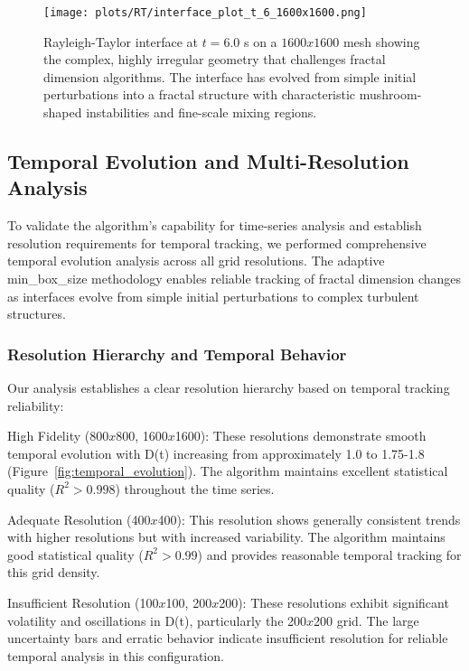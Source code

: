 \documentclass[preprint,12pt]{elsarticle}
\def\textbf#1{#1}%
\def\times{x}%
\begin{document}
\begin{figure}[htb]
\centering
\texttt{[image: plots/RT/interface\_plot\_t\_6\_1600x1600.png]}
\caption{Rayleigh-Taylor interface at $t = 6.0$ s on a $1600 \times 1600$ mesh showing the complex, highly irregular geometry that challenges fractal dimension algorithms. The interface has evolved from simple initial perturbations into a fractal structure with characteristic mushroom-shaped instabilities and fine-scale mixing regions.}
\label{fig:rt_interface_t6}
\end{figure}

\subsection{Temporal Evolution and Multi-Resolution Analysis}
\label{subsec:temporal_evolution}

To validate the algorithm's capability for time-series analysis and establish resolution requirements for temporal tracking, we performed comprehensive temporal evolution analysis across all grid resolutions. The adaptive min\_box\_size methodology enables reliable tracking of fractal dimension changes as interfaces evolve from simple initial perturbations to complex turbulent structures.

\subsubsection{Resolution Hierarchy and Temporal Behavior}

Our analysis establishes a clear resolution hierarchy based on temporal tracking reliability:

\textbf{High Fidelity (800$\times$800, 1600$\times$1600):} These resolutions demonstrate smooth temporal evolution with D(t) increasing from approximately 1.0 to 1.75-1.8 (Figure~\ref{fig:temporal_evolution}). The algorithm maintains excellent statistical quality ($R^2 > 0.998$) throughout the time series.

\textbf{Adequate Resolution (400$\times$400):} This resolution shows generally consistent trends with higher resolutions but with increased variability. The algorithm maintains good statistical quality ($R^2 > 0.99$) and provides reasonable temporal tracking for this grid density.

\textbf{Insufficient Resolution (100$\times$100, 200$\times$200):} These resolutions exhibit significant volatility and oscillations in D(t), particularly the 200$\times$200 grid. The large uncertainty bars and erratic behavior indicate insufficient resolution for reliable temporal analysis in this configuration.
\end{document}
